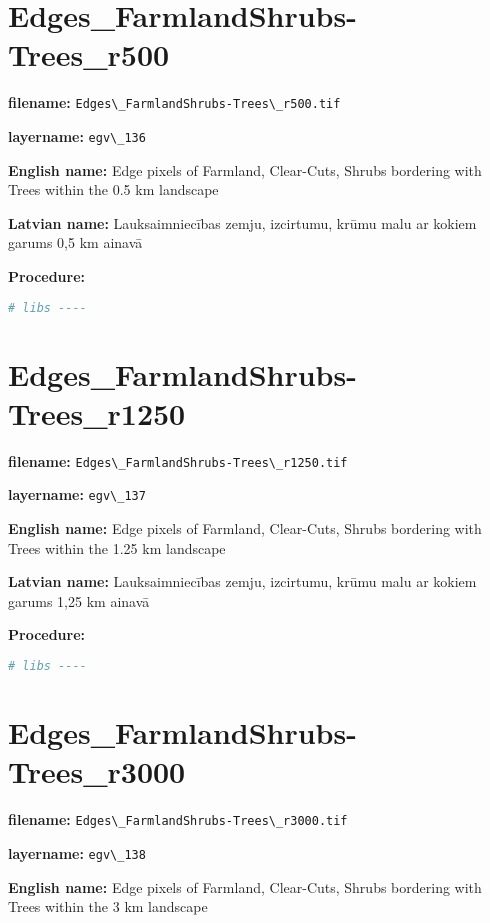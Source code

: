 \documentclass[
]{book}
\newcommand{\passthrough}[1]{#1}
\begin{document}
\section{Edges\_FarmlandShrubs-Trees\_r500}\label{ch06.136}

\textbf{filename:} \passthrough{\lstinline!Edges\_FarmlandShrubs-Trees\_r500.tif!}

\textbf{layername:} \passthrough{\lstinline!egv\_136!}

\textbf{English name:} Edge pixels of Farmland, Clear-Cuts, Shrubs bordering with Trees within the 0.5 km landscape

\textbf{Latvian name:} Lauksaimniecības zemju, izcirtumu, krūmu malu ar kokiem garums 0,5 km ainavā

\textbf{Procedure:}

\begin{lstlisting}[language=R]
# libs ----
\end{lstlisting}

\section{Edges\_FarmlandShrubs-Trees\_r1250}\label{ch06.137}

\textbf{filename:} \passthrough{\lstinline!Edges\_FarmlandShrubs-Trees\_r1250.tif!}

\textbf{layername:} \passthrough{\lstinline!egv\_137!}

\textbf{English name:} Edge pixels of Farmland, Clear-Cuts, Shrubs bordering with Trees within the 1.25 km landscape

\textbf{Latvian name:} Lauksaimniecības zemju, izcirtumu, krūmu malu ar kokiem garums 1,25 km ainavā

\textbf{Procedure:}

\begin{lstlisting}[language=R]
# libs ----
\end{lstlisting}

\section{Edges\_FarmlandShrubs-Trees\_r3000}\label{ch06.138}

\textbf{filename:} \passthrough{\lstinline!Edges\_FarmlandShrubs-Trees\_r3000.tif!}

\textbf{layername:} \passthrough{\lstinline!egv\_138!}

\textbf{English name:} Edge pixels of Farmland, Clear-Cuts, Shrubs bordering with Trees within the 3 km landscape
\end{document}
